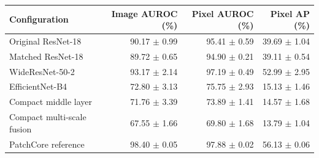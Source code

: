 \begin{tabular}{lrrr}
\hline
Configuration & Image AUROC (\%) & Pixel AUROC (\%) & Pixel AP (\%) \\
\hline
Original ResNet-18 & 90.17 $\pm$ 0.99 & 95.41 $\pm$ 0.59 & 39.69 $\pm$ 1.04 \\
Matched ResNet-18 & 89.72 $\pm$ 0.65 & 94.90 $\pm$ 0.21 & 39.11 $\pm$ 0.54 \\
WideResNet-50-2 & 93.17 $\pm$ 2.14 & 97.19 $\pm$ 0.49 & 52.99 $\pm$ 2.95 \\
EfficientNet-B4 & 72.80 $\pm$ 3.13 & 75.75 $\pm$ 2.93 & 15.13 $\pm$ 1.46 \\
Compact middle layer & 71.76 $\pm$ 3.39 & 73.89 $\pm$ 1.41 & 14.57 $\pm$ 1.68 \\
Compact multi-scale fusion & 67.55 $\pm$ 1.66 & 69.80 $\pm$ 1.68 & 13.79 $\pm$ 1.04 \\
PatchCore reference & 98.40 $\pm$ 0.05 & 97.88 $\pm$ 0.02 & 56.13 $\pm$ 0.06 \\
\hline
\end{tabular}
